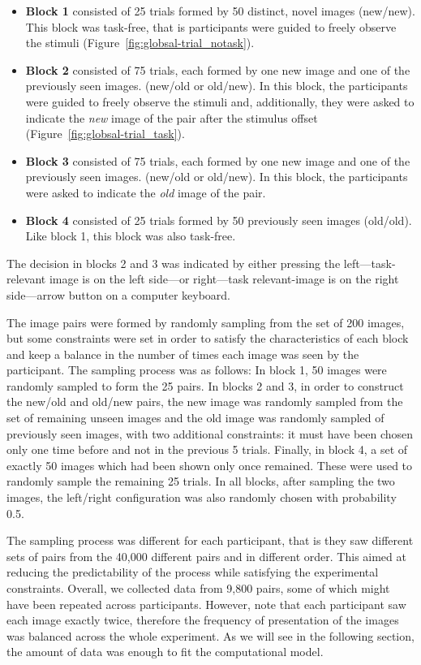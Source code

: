 {\begin{itemize}
    \item \textbf{Block 1} consisted of 25 trials formed by 50 distinct, novel images (new/new). This block was task-free, that is participants were guided to freely observe the stimuli (Figure~\ref{fig:globsal-trial_notask}).
    \item \textbf{Block 2} consisted of 75 trials, each formed by one new image and one of the previously seen images. (new/old or old/new). In this block, the participants were guided to freely observe the stimuli and, additionally, they were asked to indicate the \textit{new} image of the pair after the stimulus offset (Figure~\ref{fig:globsal-trial_task}).
    \item \textbf{Block 3} consisted of 75 trials, each formed by one new image and one of the previously seen images. (new/old or old/new). In this block, the participants were asked to indicate the \textit{old} image of the pair.
    \item \textbf{Block 4} consisted of 25 trials formed by 50 previously seen images (old/old). Like block 1, this block was also task-free.
\end{itemize}

The decision in blocks 2 and 3 was indicated by either pressing the left---task-relevant image is on the left side---or right---task relevant-image is on the right side---arrow button on a computer keyboard. 

The image pairs were formed by randomly sampling from the set of 200 images, but some constraints were set in order to satisfy the characteristics of each block and keep a balance in the number of times each image was seen by the participant. The sampling process was as follows: In block 1, 50 images were randomly sampled to form the 25 pairs. In blocks 2 and 3, in order to construct the new/old and old/new pairs, the new image was randomly sampled from the set of remaining unseen images and the old image was randomly sampled of previously seen images, with two additional constraints: it must have been chosen only one time before and not in the previous 5 trials. Finally, in block 4, a set of exactly 50 images which had been shown only once remained. These were used to randomly sample the remaining 25 trials. In all blocks, after sampling the two images, the left/right configuration was also randomly chosen with probability 0.5.
    
The sampling process was different for each participant, that is they saw different sets of pairs from the 40,000 different pairs and in different order. This aimed at reducing the predictability of the process while satisfying the experimental constraints. Overall, we collected data from 9,800 pairs, some of which might have been repeated across participants. However, note that each participant saw each image exactly twice, therefore the frequency of presentation of the images was balanced across the whole experiment. As we will see in the following section, the amount of data was enough to fit the computational model. 

}
